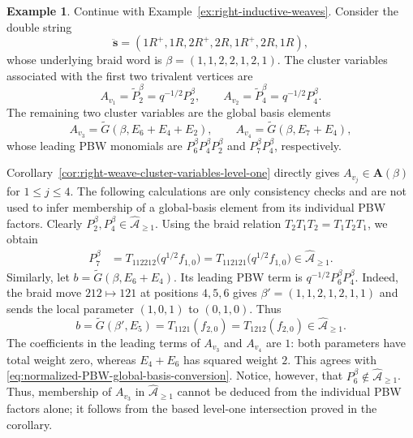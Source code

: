 \documentclass[12pt, reqno]{amsart}
\theoremstyle{plain}
\theoremstyle{definition}
\newtheorem{example}[theorem]{Example}
\numberwithin{equation}{section}
\newcommand{\cA}{\mathcal{A}}
\begin{document}
\begin{example}\label{ex:normalized-seven-letter-word}
Continue with Example~\ref{ex:right-inductive-weaves}. Consider the
double string
\begin{equation*}
\ddot{\mathbf s}
=(1R^+,1R,2R^+,2R,1R^+,2R,1R),
\end{equation*}
whose underlying braid word is
\(\beta=(1,1,2,2,1,2,1)\). The cluster variables associated with the
first two trivalent vertices are
\begin{equation*}
A_{v_1}=\widetilde P_2^\beta=q^{-1/2}P_2^\beta,
\qquad
A_{v_2}=\widetilde P_4^\beta=q^{-1/2}P_4^\beta.
\end{equation*}
The remaining two cluster variables are the global basis elements
\begin{equation*}
A_{v_3}=\widetilde G(\beta,E_6+E_4+E_2),
\qquad
A_{v_4}=\widetilde G(\beta,E_7+E_4),
\end{equation*}
whose leading PBW monomials are \(P_6^\beta P_4^\beta P_2^\beta\)
and \(P_7^\beta P_4^\beta\), respectively.

Corollary~\ref{cor:right-weave-cluster-variables-level-one} directly gives
\(A_{v_j}\in\mathbf A(\beta)\) for \(1\leq j\leq4\). The following
calculations are only consistency checks and are not used to infer
membership of a global-basis element from its individual PBW factors.
Clearly \(P_2^\beta,P_4^\beta\in\widehat{\cA}_{\geq1}\). Using the braid
relation \(T_2T_1T_2=T_1T_2T_1\), we obtain
\begin{align*}
P_7^\beta
 &=T_{112212}\bigl(q^{1/2}f_{1,0}\bigr)
  =T_{112121}\bigl(q^{1/2}f_{1,0}\bigr)
  \in\widehat{\cA}_{\geq1}.
\end{align*}
Similarly, let \(b=\widetilde G(\beta,E_6+E_4)\). Its leading PBW
term is \(q^{-1/2}P_6^\beta P_4^\beta\). Indeed, the braid move
\(212\mapsto121\) at positions \(4,5,6\) gives
\(\beta'=(1,1,2,1,2,1,1)\) and sends the local parameter
\((1,0,1)\) to \((0,1,0)\). Thus
\begin{equation*}
b=\widetilde G(\beta',E_5)
 =T_{1121}(f_{2,0})
 =T_{1212}(f_{2,0})
 \in\widehat{\cA}_{\geq1}.
\end{equation*}
The coefficients in the leading terms of \(A_{v_3}\) and
\(A_{v_4}\) are \(1\): both parameters have total weight zero,
whereas \(E_4+E_6\) has squared weight \(2\). This agrees with
\eqref{eq:normalized-PBW-global-basis-conversion}.
Notice, however, that \(P_6^\beta\notin\widehat{\cA}_{\geq1}\).
Thus, membership of \(A_{v_3}\) in
\(\widehat{\cA}_{\geq1}\) cannot be deduced from the individual PBW
factors alone; it follows from the based level-one intersection proved in
the corollary.
\end{example}
\end{document}
